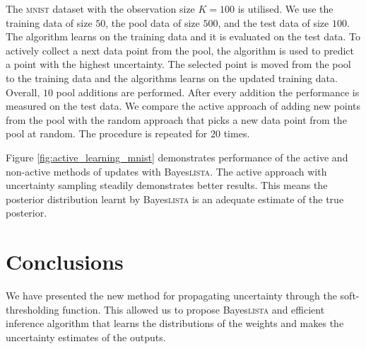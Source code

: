 \documentclass{article}
\begin{document}
 The \textsc{mnist} dataset with the observation size $K=100$ is utilised. We use the training data of size $50$, the pool data of size $500$,  and the test data of size $100$. The algorithm learns on the training data and it is evaluated on the test data. To actively collect a next data point from the pool, the algorithm is used to predict a point with the highest uncertainty. The selected point is moved from the pool to the training data and the algorithms learns on the updated training data. Overall, $10$ pool additions are performed. After every addition the performance is measured on the test data. We compare the active approach of adding new points from the pool with the random approach that picks a new data point from the pool at random. The procedure is repeated for $20$ times.

  Figure \ref{fig:active_learning_mnist} demonstrates performance of the active and non-active methods of updates with Bayes\textsc{lista}. The active approach with uncertainty sampling steadily demonstrates better results. This means the posterior distribution learnt by Bayes\textsc{lista} is an adequate estimate of the true posterior.

  \section{Conclusions}
  \label{sec:conclusions}
  We have presented the new method for propagating uncertainty through the soft-thresholding function.
  This allowed us to propose Bayes\textsc{lista} and efficient inference algorithm that learns the distributions of the weights and makes the uncertainty estimates of the outputs. %
\end{document}
